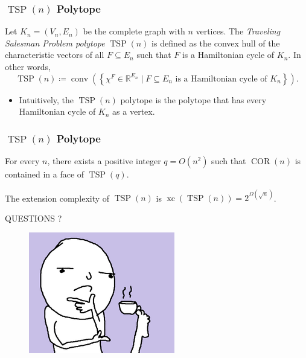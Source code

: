 \documentclass{beamer}
\newcommand{\conv}{\operatorname{conv}}
\newcommand{\xc}{\operatorname{xc}}
\newcommand{\TSP}{\operatorname{TSP}}
\newcommand{\COR}{\operatorname{COR}}
\renewcommand{\R}{\mathbb{R}}
\begin{document}



\begin{frame}
\frametitle{$\TSP(n)$ Polytope}

\pause
\begin{definition}[$\TSP$ Polytope]
Let $K_n = (V_n, E_n)$ be the complete graph with $n$ vertices. The \emph{Traveling Salesman Problem polytope} $\TSP(n)$ is defined as the convex hull of the characteristic vectors of all $F \subseteq E_n$ such that $F$ is a Hamiltonian cycle of $K_n$. In other words,
\[
\TSP(n) \coloneqq \conv\left(\left\{\chi^F \in \R^{E_n} \mid F \subseteq E_n \text{ is a Hamiltonian cycle of $K_n$}\right\}\right).
\]
\end{definition}

\pause
\begin{itemize}
\item Intuitively, the $\TSP(n)$ polytope is the polytope that has every Hamiltonian cycle of $K_n$ as a vertex.
\end{itemize}

\end{frame}

\begin{frame}
\frametitle{$\TSP(n)$ Polytope}

\pause
\begin{lemma}
For every $n$, there exists a positive integer $q = O(n^2)$ such that $\COR(n)$ is contained in a face of $\TSP(q)$.
\end{lemma}

\pause
\begin{theorem}
The extension complexity of $\TSP(n)$ is $\xc\left(\TSP(n)\right) = 2^{\Omega\left(\sqrt{n}\right)}$.
\end{theorem}

\end{frame}



\begin{frame}
\begin{center}
\LARGE{QUESTIONS ?}
\end{center}
\begin{figure}
        \centering
        \begin{minipage}{.5\textwidth}
            \centering
            \includegraphics[width=.8\linewidth]{questions.png}
        \end{minipage}%
        
\end{figure}
\end{frame}
\end{document}
